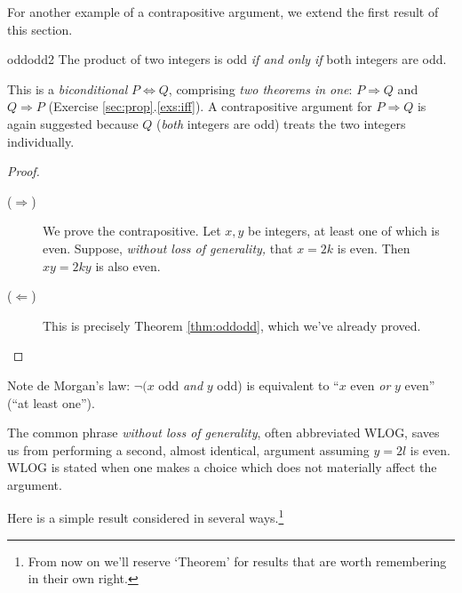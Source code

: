 \goodbreak


For another example of a contrapositive argument, we extend the first result of this section.

\begin{thm}{}{oddodd2}
	The product of two integers is odd \emph{if and only if} both integers are odd.
\end{thm}

This is a \emph{biconditional} $P\Longleftrightarrow Q$, comprising \emph{two theorems in one}: $P\Longrightarrow Q$ and $Q\Longrightarrow P$ (Exercise \ref*{sec:prop}.\ref{exs:iff}). A contrapositive argument for $P\Longrightarrow Q$ is again suggested because $Q$ (\emph{both} integers are odd) treats the two integers individually.

\begin{proof}
	\begin{description}
		\item[\normalfont ($\Rightarrow$)] We prove the contrapositive. Let $x,y$ be integers, at least one of which is even. Suppose, \emph{without loss of generality,} that $x=2k$ is even. Then $xy=2ky$ is also even.
		\item[\normalfont ($\Leftarrow$)] This is precisely Theorem \ref{thm:oddodd}, which we've already proved.\qedhere
	\end{description}
\end{proof}

Note de Morgan's law: $\neg(x$ odd \emph{and} $y$ odd) is equivalent to ``$x$ even \emph{or} $y$ even'' (``at least one'').\par

The common phrase \emph{without loss of generality}, often abbreviated WLOG, saves us from performing a second, almost identical, argument assuming $y=2l$ is even. WLOG is stated when one makes a choice which does not materially affect the argument.



Here is a simple result considered in several ways.\footnote{%
	From now on we'll reserve `Theorem' for results that are worth remembering in their own right.
}


